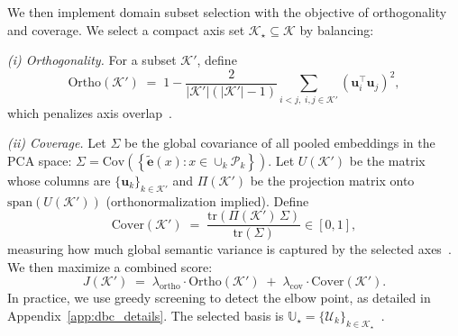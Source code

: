 We then implement domain subset selection with the objective of orthogonality and coverage.
We select a compact axis set $\mathcal{K}_\star\subseteq\mathcal{K}$ by balancing:

\emph{(i) Orthogonality.} For a subset $\mathcal{K}'$, define
{\small
\begin{equation}
\label{eq:dbc:ortho}
\mathrm{Ortho}(\mathcal{K}')
\;=\;
1-\frac{2}{\lvert\mathcal{K}'\rvert(\lvert\mathcal{K}'\rvert-1)}
\sum_{i<j,\; i,j\in\mathcal{K}'}
\left(\mathbf{u}_i^\top \mathbf{u}_j\right)^2,
\end{equation}
}
which penalizes axis overlap~\cite{bjorck1973angles}.

\emph{(ii) Coverage.} Let $\Sigma$ be the global covariance of all pooled embeddings in the PCA space:
$\Sigma=\mathrm{Cov}\left(\left\{\tilde{\mathbf e}\left(x\right): x\in\cup_k\mathcal{P}_k\right\}\right)$.
Let $U(\mathcal{K}')$ be the matrix whose columns are $\{\mathbf{u}_k\}_{k\in\mathcal{K}'}$ and
$\Pi(\mathcal{K}')$ be the projection matrix onto $\mathrm{span}(U(\mathcal{K}'))$
(orthonormalization implied). Define
\begin{equation}
\label{eq:dbc:cover}
\mathrm{Cover}(\mathcal{K}')
\;=\;
\frac{\mathrm{tr}\!\left(\Pi\left(\mathcal{K}'\right)\,\Sigma\right)}{\mathrm{tr}(\Sigma)}\in[0,1],
\end{equation}
measuring how much global semantic variance is captured by the selected axes~\cite{jolliffe2002pca}. We then maximize a combined score:
\begin{equation}
\label{eq:dbc:objective}
J(\mathcal{K}') \;=\; \lambda_{\mathrm{ortho}}\cdot \mathrm{Ortho}(\mathcal{K}')
\;+\; \lambda_{\mathrm{cov}}\cdot \mathrm{Cover}(\mathcal{K}').
\end{equation}
In practice, we use greedy screening to detect the elbow point, as detailed in Appendix~\ref{app:dbc_details}.
The selected basis is $\mathbb{U}_\star=\{\mathcal{U}_k\}_{k\in\mathcal{K}_\star}$~\cite{satopaa2011finding}.



